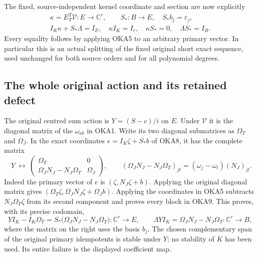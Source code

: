 \documentclass[11pt,a4paper]{article}
\begin{document}
The fixed, source-independent kernel coordinate and section are
now explicitly
\[
 \begin{gathered}
 \kappa=E_T^T\mathcal V:E\to\mathbb C^r,
 \qquad S_*:B\to E,\quad S_*b_j=\varepsilon_j,
 \\
 I_K\kappa+S_*\Lambda=I_E,
 \quad\kappa I_K=I_r,\quad\kappa S_*=0,\quad\Lambda S_*=I_B.
 \end{gathered}
 \tag{OKA8}
\]
Every equality follows by applying OKA5 to an arbitrary primary
vector. In particular this is an actual splitting of the fixed
original short exact sequence, used unchanged for both source
orders and for all polynomial degrees.

\subsection{The whole original action and its retained defect}

The original centred sum action is $Y=(S-c)/i$ on $E$.
Under $\mathcal V$ it is the diagonal matrix of the
$\omega_{ab}$ in OKA1. Write its two diagonal submatrices
as $\Omega_T$ and $\Omega_J$. In the exact coordinates
$e=I_K\zeta+S_*b$ of OKA8, it has the complete matrix
\[
 \boxed{\quad
 Y\ \longleftrightarrow\
 \begin{pmatrix}
   \Omega_T&0\\
   \Omega_JN_J-N_J\Omega_T&\Omega_J
 \end{pmatrix},\qquad
 (\Omega_JN_J-N_J\Omega_T)_{jt}
                 =(\omega_j-\omega_t)(N_J)_{jt}.
 \quad}\tag{OKA9}
\]
Indeed the primary vector of $e$ is
$(\zeta,N_J\zeta+b)$. Applying the original diagonal matrix
gives $(\Omega_T\zeta,\Omega_JN_J\zeta+\Omega_Jb)$.
Applying the coordinates in OKA5 subtracts
$N_J\Omega_T\zeta$ from its second component and proves
every block in OKA9. This proves, with its precise codomain,
\[
 YI_K-I_K\Omega_T
     =S_*\bigl(\Omega_JN_J-N_J\Omega_T\bigr)
                :\mathbb C^r\to E,\qquad
 \Lambda YI_K=\Omega_JN_J-N_J\Omega_T:\mathbb C^r\to B,
 \tag{OKA10}
\]
where the matrix on the right uses the basis $b_j$.
The chosen complementary span of the original primary idempotents
is stable under $Y$; no stability of $K$ has been used. Its
entire failure is the displayed coefficient map.
\end{document}
